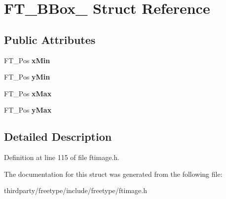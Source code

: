 \hypertarget{struct_f_t___b_box__}{}\section{F\+T\+\_\+\+B\+Box\+\_\+ Struct Reference}
\label{struct_f_t___b_box__}
\subsection*{Public Attributes}
\begin{DoxyCompactItemize}
\item 
\mbox{\label{struct_f_t___b_box___a1f2a5d0565d496c1d41e43d018f45add}} 
F\+T\+\_\+\+Pos {\bfseries x\+Min}
\item 
\mbox{\label{struct_f_t___b_box___a959ca1d5bc1c5338da0d85c8e7135f4e}} 
F\+T\+\_\+\+Pos {\bfseries y\+Min}
\item 
\mbox{\label{struct_f_t___b_box___ac6da5c44f4cb7b97eef1f438eb69c0ec}} 
F\+T\+\_\+\+Pos {\bfseries x\+Max}
\item 
\mbox{\label{struct_f_t___b_box___a77084921589f386a8a593ae1f25b1569}} 
F\+T\+\_\+\+Pos {\bfseries y\+Max}
\end{DoxyCompactItemize}


\subsection{Detailed Description}


Definition at line 115 of file ftimage.\+h.



The documentation for this struct was generated from the following file\+:\begin{DoxyCompactItemize}
\item 
thirdparty/freetype/include/freetype/ftimage.\+h\end{DoxyCompactItemize}
